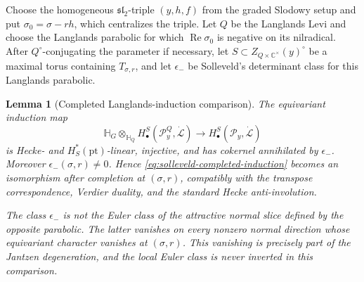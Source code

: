 \documentclass[10pt,a4paper]{amsart}
\newtheorem{lemma}[theorem]{Lemma}
\newcommand{\Hh}{\mathbb H}
\begin{document}
Choose the homogeneous $\mathfrak{sl}_2$-triple $(y,h,f)$ from the graded
Slodowy setup and put
$\sigma_0=\sigma-rh$, which centralizes the triple.  Let $Q$ be the Langlands
Levi and choose the Langlands parabolic for which
$\operatorname{Re}\sigma_0$ is negative on its nilradical.  After
$Q^\circ$-conjugating the parameter if necessary, let
$S\subset Z_{Q\times\mathbb C^\times}(y)^\circ$ be a maximal torus containing
$T_{\sigma,r}$, and let $\epsilon_-$ be Solleveld's
determinant class for this Langlands parabolic.

\begin{lemma}[Completed Langlands-induction comparison]
\label{lem:two-induction-square}
The equivariant induction
map
\begin{equation}\label{eq:solleveld-completed-induction}
 \Hh_G\otimes_{\Hh_Q}
 H^S_\bullet(\mathcal P_y^Q,\dot{\mathcal L})
 \longrightarrow H^S_\bullet(\mathcal P_y,\dot{\mathcal L})
\end{equation}
is Hecke- and $H_S^*(\mathrm{pt})$-linear, injective, and has cokernel
annihilated by $\epsilon_-$.  Moreover $\epsilon_-(\sigma,r)\ne0$.  Hence
\eqref{eq:solleveld-completed-induction} becomes an isomorphism after
completion at $(\sigma,r)$, compatibly with the transpose correspondence,
Verdier duality, and the standard Hecke anti-involution.

The class $\epsilon_-$ is not the Euler class of the attractive normal slice
defined by the opposite parabolic.  The latter vanishes on every nonzero
normal direction whose equivariant character vanishes at $(\sigma,r)$.  This
vanishing is precisely part of the Jantzen degeneration, and the local Euler
class is never inverted in this comparison.
\end{lemma}
\end{document}
